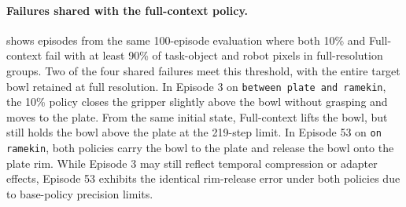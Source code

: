 \paragraph{Failures shared with the full-context policy.}
     shows episodes from the same 100-episode evaluation where both 10\% \method and Full-context fail with at least 90\% of task-object and robot pixels in full-resolution groups.
    Two of the four shared failures meet this threshold, with the entire target bowl retained at full resolution.
    In Episode 3 on \texttt{between plate and ramekin}, the 10\% policy closes the gripper slightly above the bowl without grasping and moves to the plate.
    From the same initial state, Full-context lifts the bowl, but still holds the bowl above the plate at the 219-step limit.
    In Episode 53 on \texttt{on ramekin}, both policies carry the bowl to the plate and release the bowl onto the plate rim.
    While Episode 3 may still reflect temporal compression or adapter effects, Episode 53 exhibits the identical rim-release error under both policies due to base-policy precision limits.